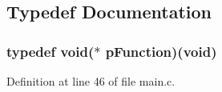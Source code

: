 \subsection{\-Typedef \-Documentation}
\hypertarget{group___revo_mini_b_l_ga9227bf1f1a9c633a0cc9ca50cc761c1a}{
\subsubsection[{p\-Function}]{\setlength{\rightskip}{0pt plus 5cm}typedef void($\ast$ {\bf p\-Function})(void)}}\label{group___revo_mini_b_l_ga9227bf1f1a9c633a0cc9ca50cc761c1a}


\-Definition at line 46 of file main.\-c.




